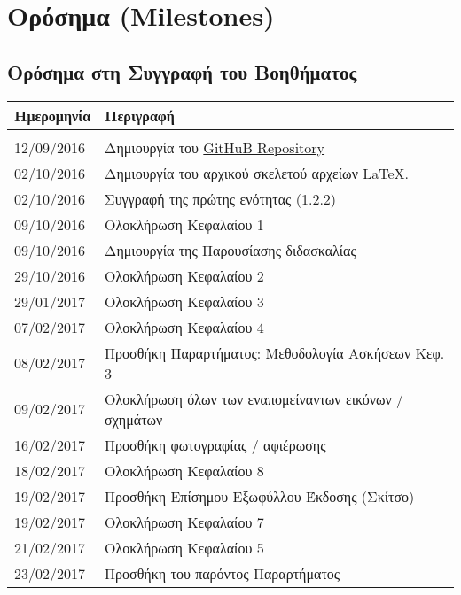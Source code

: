 \chapter{Ορόσημα (Milestones)}
\newpage
\section{Ορόσημα στη Συγγραφή του Βοηθήματος}

\begin{tabular}{ll}
\textbf{Ημερομηνία} & \textbf{Περιγραφή} \\
\hline\\
 12/09/2016 & Δημιουργία του \href{https://github.com/sonic2000gr/diktia}{GitHuB Repository}\\ 
 02/10/2016 & Δημιουργία του αρχικού σκελετού αρχείων \LaTeX.\\
 02/10/2016 & Συγγραφή της πρώτης ενότητας (1.2.2)\\
 09/10/2016 & Ολοκλήρωση Κεφαλαίου 1\\
 09/10/2016 & Δημιουργία της Παρουσίασης διδασκαλίας\\
 29/10/2016 & Ολοκλήρωση Κεφαλαίου 2\\
 29/01/2017 & Ολοκλήρωση Κεφαλαίου 3\\
 07/02/2017 & Ολοκλήρωση Κεφαλαίου 4\\
 08/02/2017 & Προσθήκη Παραρτήματος: Μεθοδολογία Ασκήσεων Κεφ. 3\\
 09/02/2017 & Ολοκλήρωση όλων των εναπομείναντων εικόνων / σχημάτων\\
 16/02/2017 & Προσθήκη φωτογραφίας / αφιέρωσης\\
 18/02/2017 & Ολοκλήρωση Κεφαλαίου 8\\
 19/02/2017 & Προσθήκη Επίσημου Εξωφύλλου Έκδοσης (Σκίτσο)\\
 19/02/2017 & Ολοκλήρωση Κεφαλαίου 7\\
 21/02/2017 & Ολοκλήρωση Κεφαλαίου 5\\
 23/02/2017 & Προσθήκη του παρόντος Παραρτήματος\\
\hline
\end{tabular}
